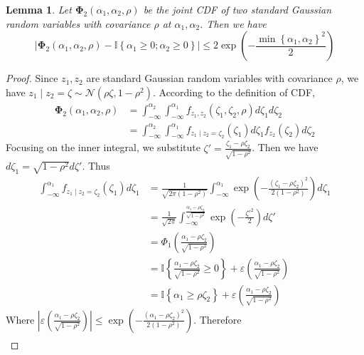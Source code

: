 \documentclass[10pt]{article} %
\newtheorem{lemma}[theorem]{Lemma}
\theoremstyle{definition}
\theoremstyle{plain}
\newcommand{\paren}[1]{\left(#1\right)}
\begin{document}
\begin{lemma}
    \label{lem:gaus_cdf2_approx}
    Let $\bm{\Phi}_2\paren{\alpha_1, \alpha_2, \rho}$ be the joint CDF of two standard Gaussian random variables with covariance $\rho$ at $\alpha_1, \alpha_2$. Then we have
    \[
        \left|\bm{\Phi}_2\paren{\alpha_1,\alpha_2,\rho} - \mathbb{I}\left\{\alpha_1\geq 0;\alpha_2\geq 0\right\}\right| \leq 2\exp\paren{-\frac{\min\left\{\alpha_1,\alpha_2\right\}^2}{2}}
    \]
\end{lemma}
\begin{proof}
    Since $z_1, z_2$ are standard Gaussian random variables with covariance $\rho$, we have $z_1\mid z_2 = \zeta\sim\mathcal{N}\paren{\rho\zeta, 1 - \rho^2}$. According to the definition of CDF,
    \begin{align*}
        \bm{\Phi}_2\paren{\alpha_1,\alpha_2,\rho} & = \int_{-\infty}^{\alpha_2}\int_{-\infty}^{\alpha_1}f_{z_1,z_2}\paren{\zeta_1,\zeta_2,\rho}d\zeta_1d\zeta_2\\
        & = \int_{-\infty}^{\alpha_2}\int_{-\infty}^{\alpha_1}f_{z_1\mid z_2=\zeta_2}\paren{\zeta_1}d\zeta_1f_{z_2}\paren{\zeta_2}d\zeta_2
    \end{align*}
    Focusing on the inner integral, we substitute $\zeta' = \frac{\zeta_1 - \rho\zeta_2}{\sqrt{1 - \rho^2}}$. Then we have $d\zeta_1 = \sqrt{1 - \rho^2}d\zeta'$. Thus
    \begin{align*}
        \int_{-\infty}^{\alpha_1}f_{z_1\mid z_2=\zeta_2}\paren{\zeta_1}d\zeta_1 &= \frac{1}{\sqrt{2\pi(1 - \rho^2)}}\int_{-\infty}^{\alpha_1}\exp\paren{-\frac{\paren{\zeta_1 - \rho\zeta_2}^2}{2(1-\rho^2)}}d\zeta_1\\
        & = \frac{1}{\sqrt{2\pi}}\int_{-\infty}^{\frac{\alpha_1 - \rho\zeta_2}{\sqrt{1 - \rho^2}}}\exp\paren{-\frac{\zeta'^2}{2}}d\zeta'\\
        & = \Phi_1\paren{\frac{\alpha_1 - \rho\zeta_2}{\sqrt{1 - \rho^2}}}\\
        & = \mathbb{I}\left\{\frac{\alpha_1 - \rho\zeta_2}{\sqrt{1 - \rho^2}} \geq 0\right\} + \varepsilon\paren{\frac{\alpha_1 - \rho\zeta_2}{\sqrt{1 - \rho^2}}}\\
        & = \mathbb{I}\left\{\alpha_1 \geq \rho\zeta_2\right\} + \varepsilon\paren{\frac{\alpha_1 - \rho\zeta_2}{\sqrt{1 - \rho^2}}}
    \end{align*}
    Where $\left|\varepsilon\paren{\frac{\alpha_1 - \rho\zeta_2}{\sqrt{1 - \rho^2}}}\right|\leq \exp\paren{-\frac{\paren{\alpha_1 - \rho\zeta_2}^2}{2(1 - \rho^2)}}$. Therefore
    \begin{align*}

\end{align*}
\end{proof}
\end{document}
